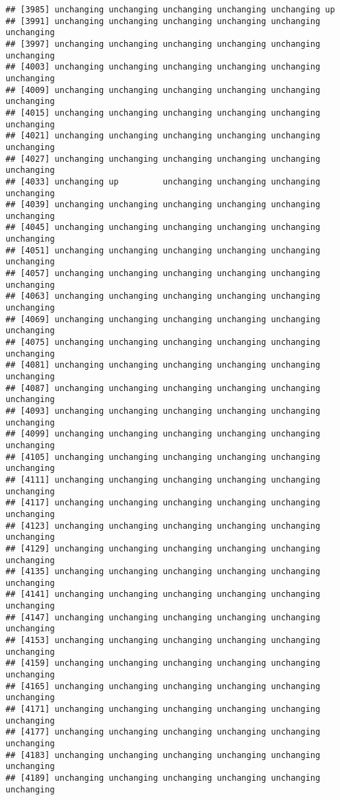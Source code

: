 \documentclass[]{article}
\begin{document}
\begin{verbatim}
## [3985] unchanging unchanging unchanging unchanging unchanging up        
## [3991] unchanging unchanging unchanging unchanging unchanging unchanging
## [3997] unchanging unchanging unchanging unchanging unchanging unchanging
## [4003] unchanging unchanging unchanging unchanging unchanging unchanging
## [4009] unchanging unchanging unchanging unchanging unchanging unchanging
## [4015] unchanging unchanging unchanging unchanging unchanging unchanging
## [4021] unchanging unchanging unchanging unchanging unchanging unchanging
## [4027] unchanging unchanging unchanging unchanging unchanging unchanging
## [4033] unchanging up         unchanging unchanging unchanging unchanging
## [4039] unchanging unchanging unchanging unchanging unchanging unchanging
## [4045] unchanging unchanging unchanging unchanging unchanging unchanging
## [4051] unchanging unchanging unchanging unchanging unchanging unchanging
## [4057] unchanging unchanging unchanging unchanging unchanging unchanging
## [4063] unchanging unchanging unchanging unchanging unchanging unchanging
## [4069] unchanging unchanging unchanging unchanging unchanging unchanging
## [4075] unchanging unchanging unchanging unchanging unchanging unchanging
## [4081] unchanging unchanging unchanging unchanging unchanging unchanging
## [4087] unchanging unchanging unchanging unchanging unchanging unchanging
## [4093] unchanging unchanging unchanging unchanging unchanging unchanging
## [4099] unchanging unchanging unchanging unchanging unchanging unchanging
## [4105] unchanging unchanging unchanging unchanging unchanging unchanging
## [4111] unchanging unchanging unchanging unchanging unchanging unchanging
## [4117] unchanging unchanging unchanging unchanging unchanging unchanging
## [4123] unchanging unchanging unchanging unchanging unchanging unchanging
## [4129] unchanging unchanging unchanging unchanging unchanging unchanging
## [4135] unchanging unchanging unchanging unchanging unchanging unchanging
## [4141] unchanging unchanging unchanging unchanging unchanging unchanging
## [4147] unchanging unchanging unchanging unchanging unchanging unchanging
## [4153] unchanging unchanging unchanging unchanging unchanging unchanging
## [4159] unchanging unchanging unchanging unchanging unchanging unchanging
## [4165] unchanging unchanging unchanging unchanging unchanging unchanging
## [4171] unchanging unchanging unchanging unchanging unchanging unchanging
## [4177] unchanging unchanging unchanging unchanging unchanging unchanging
## [4183] unchanging unchanging unchanging unchanging unchanging unchanging
## [4189] unchanging unchanging unchanging unchanging unchanging unchanging

\end{verbatim}
\end{document}

